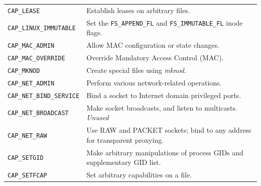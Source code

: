 \documentclass[a4paper]{article}
\begin{document}
\begin{table}
\begin{tabular}{@{}lp{8cm}@{}}
\verb|CAP_LEASE| &
Establish leases on arbitrary files.\\

\verb|CAP_LINUX_IMMUTABLE| &
Set the \verb|FS_APPEND_FL| and \verb|FS_IMMUTABLE_FL| inode flags.\\

\verb|CAP_MAC_ADMIN| &
Allow MAC configuration or state changes.\\

\verb|CAP_MAC_OVERRIDE| &
Override Mandatory Access Control (MAC).\\

\verb|CAP_MKNOD| &
Create special files using \emph{mknod}.\\

\verb|CAP_NET_ADMIN| &
Perform various network-related operations.\\

\verb|CAP_NET_BIND_SERVICE| &
Bind a socket to Internet domain privileged ports.\\

\verb|CAP_NET_BROADCAST| &
Make socket broadcasts, and listen to multicasts. \emph{Unused}\\

\verb|CAP_NET_RAW| &
Use RAW and PACKET sockets; bind to any address for transparent proxying.\\

\verb|CAP_SETGID| &
Make arbitrary manipulations of process GIDs and supplementary GID list.\\

\verb|CAP_SETFCAP| &
Set arbitrary capabilities on a file.\\
\bottomrule
\end{tabular}
\end{table}
\end{document}
